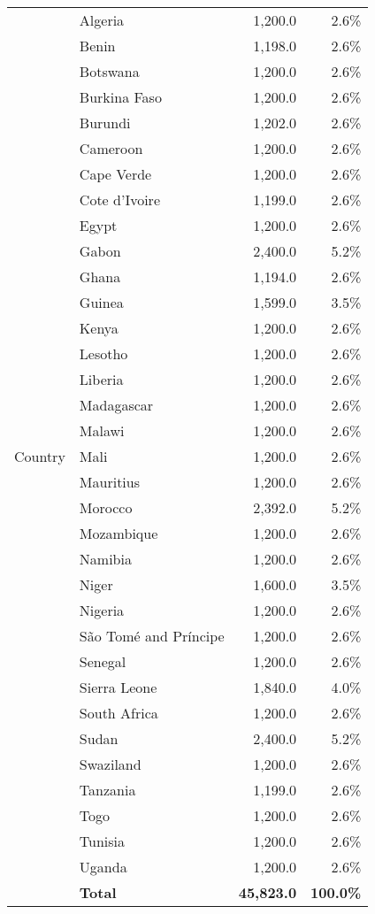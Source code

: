 \documentclass{article}
\begin{document}
\begin{table}[ht]
\begin{tabular}{llrr}
\multirow{36}{*}{Country} 
    & Algeria & 1,200.0 & 2.6\% \\
    & Benin & 1,198.0 & 2.6\% \\
    & Botswana & 1,200.0 & 2.6\% \\
    & Burkina Faso & 1,200.0 & 2.6\% \\
    & Burundi & 1,202.0 & 2.6\% \\
    & Cameroon & 1,200.0 & 2.6\% \\
    & Cape Verde & 1,200.0 & 2.6\% \\
    & Cote d'Ivoire & 1,199.0 & 2.6\% \\
    & Egypt & 1,200.0 & 2.6\% \\
    & Gabon & 2,400.0 & 5.2\% \\
    & Ghana & 1,194.0 & 2.6\% \\
    & Guinea & 1,599.0 & 3.5\% \\
    & Kenya & 1,200.0 & 2.6\% \\
    & Lesotho & 1,200.0 & 2.6\% \\
    & Liberia & 1,200.0 & 2.6\% \\
    & Madagascar & 1,200.0 & 2.6\% \\
    & Malawi & 1,200.0 & 2.6\% \\
    & Mali & 1,200.0 & 2.6\% \\
    & Mauritius & 1,200.0 & 2.6\% \\
    & Morocco & 2,392.0 & 5.2\% \\
    & Mozambique & 1,200.0 & 2.6\% \\
    & Namibia & 1,200.0 & 2.6\% \\
    & Niger & 1,600.0 & 3.5\% \\
    & Nigeria & 1,200.0 & 2.6\% \\
    & São Tomé and Príncipe & 1,200.0 & 2.6\% \\
    & Senegal & 1,200.0 & 2.6\% \\
    & Sierra Leone & 1,840.0 & 4.0\% \\
    & South Africa & 1,200.0 & 2.6\% \\
    & Sudan & 2,400.0 & 5.2\% \\
    & Swaziland & 1,200.0 & 2.6\% \\
    & Tanzania & 1,199.0 & 2.6\% \\
    & Togo & 1,200.0 & 2.6\% \\
    & Tunisia & 1,200.0 & 2.6\% \\
    & Uganda & 1,200.0 & 2.6\% \\
    & \textbf{Total} & \textbf{45,823.0} & \textbf{100.0\%} \\
\bottomrule

\end{tabular}
\end{table}
\end{document}
